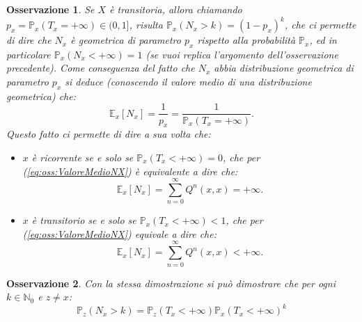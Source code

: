 \documentclass[11pt]{book}
\theoremstyle{Definizione}
\theoremstyle{TeoremaProposizioneLemmaCorollario}
\theoremstyle{OsservazioneNota}
\newtheorem{myobs}{Osservazione}[section]
\newcommand{\N}{\mathbb{N}}
\renewcommand{\P}{\mathbb{P}}
\newcommand{\E}{\mathbb{E}}
\begin{document}
\begin{myobs}
Se $X$ è transitoria, allora chiamando $p_x = \P_x(T_x = +\infty) \in (0,1]$, risulta $\P_x(N_x > k) = (1-p_x)^k$, che ci permette di dire che $N_x$ è geometrica di parametro $p_x$ rispetto alla probabilità $\P_x$, ed in particolare $\P_x(N_x <+\infty) = 1$ (se vuoi replica l'argomento dell'osservazione precedente). Come conseguenza del fatto che $N_x$ abbia distribuzione geometrica di parametro $p_x$ si deduce (conoscendo il valore medio di una distribuzione geometrica) che:
\begin{equation}\label{eq:oss:ValoreMedioNX}
\E_x[N_x] = \frac{1}{p_x} = \frac{1}{\P_x(T_x = +\infty)}.
\end{equation}
Questo fatto ci permette di dire a sua volta che:
\begin{itemize}
\item $x$ è ricorrente se e solo se $\P_x(T_x < +\infty) = 0$, che per (\ref{eq:oss:ValoreMedioNX}) è equivalente a dire che:
$$
\E_x[N_x] = \sum_{n = 0}^\infty Q^n(x,x) = +\infty.
$$
\item $x$ è transitorio se e solo se $\P_x(T_x <+\infty) < 1$, che per (\ref{eq:oss:ValoreMedioNX}) equivale a dire che:
$$
\E_x[N_x] = \sum_{n = 0}^\infty Q^n(x,x) < +\infty.
$$
\end{itemize}
\end{myobs}
\begin{myobs}
Con la stessa dimostrazione si può dimostrare che per ogni $k\in \N_0$ e $z \neq x$:
\begin{equation}\label{eq:FormulaNumeroDiVisiteMaggioreDikZDiversoDaX}
\P_z(N_x > k) = \P_z(T_x < +\infty)\P_x(T_x < +\infty)^k
\end{equation}
\end{myobs}
\end{document}
